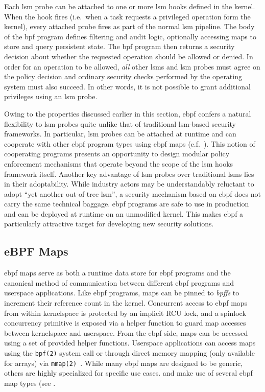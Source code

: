 Each \gls{lsm} probe can be attached to one or more \gls{lsm} hooks defined in the kernel.
When the hook fires (i.e.\ when a task requests a privileged operation form the kernel),
every attached probe fires as part of the normal \gls{lsm} pipeline. The body of the
\gls{bpf} program defines filtering and audit logic, optionally accessing maps to store
and query persistent state. The \gls{bpf} program then returns a security decision about
whether the requested operation should be allowed or denied.  In order for an operation to
be allowed, \textit{all} other \gls{lsm}s and \gls{lsm} probes must agree on the policy
decision and ordinary security checks performed by the operating system must also succeed.
In other words, it is not possible to grant additional privileges using an \gls{lsm}
probe.

Owing to the properties discussed earlier in this section, \gls{ebpf} confers a natural
flexibility to \gls{lsm} probes quite unlike that of traditional \gls{lsm}-based security
frameworks.  In particular, \gls{lsm} probes can be attached at runtime and can cooperate
with other \gls{ebpf} program types using \gls{ebpf} maps (c.f.\ ).
This notion of cooperating programs presents an opportunity to design modular policy
enforcement mechanisms that operate beyond the scope of the \gls{lsm} hooks framework
itself.  Another key advantage of \gls{lsm} probes over traditional \gls{lsm}s lies in
their adoptability.  While industry actors may be understandably reluctant to adopt
\enquote{yet another out-of-tree \gls{lsm}}, a security mechanism based on \gls{ebpf} does
not carry the same technical baggage.  \gls{ebpf} programs are safe to use in production
and can be deployed at runtime on an unmodified kernel.  This makes \gls{ebpf}
a particularly attractive target for developing new security solutions.

\subsection{eBPF Maps}%
\label{ss:bpf-maps-bg}

\gls{ebpf} maps serve as both a runtime data store for \gls{ebpf} programs and the
canonical method of communication between different \gls{ebpf} programs and userspace
applications. Like \gls{ebpf} programs, maps can be pinned to \textit{bpffs} to increment
their reference count in the kernel.  Concurrent access to \gls{ebpf} maps from within
kernelspace is protected by an implicit RCU lock, and a spinlock concurrency primitive is
exposed via a helper function to guard map accesses between kernelspace and userspace.
From the \gls{ebpf} side, maps can be accessed using a set of provided helper functions.
Userspace applications can access maps using the \texttt{bpf(2)} system call or through
direct memory mapping (only available for arrays) via
\texttt{mmap(2)~\cite{gregg2019_bpf}}. While many \gls{ebpf} maps are designed to be
generic, others are highly specialized for specific use cases. \bpfcontain{} and \bpfbox{}
make use of several \gls{ebpf} map types (see .

